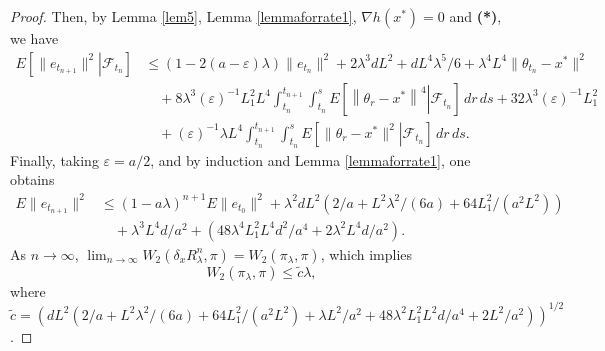 \documentclass[a4paper]{article}
\begin{document}
\begin{proof}
		Then, by  Lemma \ref{lem5}, Lemma \ref{lemmaforrate1}, $\nabla h(x^*)=0$ and {\bf (*)}, we have
		\begin{align*}
		E\left[\left.\|e_{t_{n+1}}\|^2\right| \mathcal{F}_{t_n}\right]	&\leq (1-2(a-\varepsilon)\lambda) \|e_{t_n}\|^2 +2\lambda^3dL^2+dL^4\lambda^5/6+\lambda^4L^4\|\theta_{t_n}-x^*\|^2\\
		& \hspace{1em}  +8\lambda^3(\varepsilon)^{-1}L_1^2L^4\int_{t_n}^{t_{n+1}}\int_{t_n}^sE\left[\left.\left\|\theta_r-x^*\right\|^4\right| \mathcal{F}_{t_n}\right]\,dr \,ds+32\lambda^3(\varepsilon)^{-1}L_1^2\\
		& \hspace{1em}  +(\varepsilon)^{-1}\lambda L^4\int_{t_n}^{t_{n+1}}\int_{t_n}^{s}E\left[\left.\|\theta_r- x^*\|^2\right| \mathcal{F}_{t_n}\right]\,dr  \,ds.
		\end{align*}
		Finally, taking $\varepsilon = a/2$, and by induction and Lemma \ref{lemmaforrate1}, one obtains
		\begin{align*}
		E\|e_{t_{n+1}}\|^2 	&\leq (1-a\lambda)^{n+1}E\|e_{t_0}\|^2 +\lambda^2dL^2\left(2/a+L^2\lambda^2/(6a)+64L_1^2/(a^2L^2)\right)\\
		& \hspace{1em} +\lambda^3L^4d/a^2 + \left(48\lambda^4L_1^2L^4d^2/a^4+2\lambda^2L^4d/a^2\right).
		\end{align*}
		As $n \rightarrow \infty$, $\lim_{n\rightarrow \infty}W_2(\delta_xR^n_{\lambda}, \pi) = W_2(\pi_{\lambda}, \pi)$, which implies
		\[
		W_2(\pi_{\lambda}, \pi) \leq \tilde{c}\lambda,
		\]
		where $
		\tilde{c} = \left(dL^2\left(2/a+L^2\lambda^2/(6a)+64L_1^2/(a^2L^2)+\lambda L^2/a^2+48\lambda^2 L_1^2L^2d/a^4+ 2L^2/a^2\right)\right)^{1/2}$.
		\end{proof}
		
\end{document}

